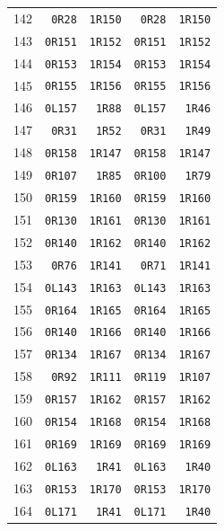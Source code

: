 \begin{longtable}{rrrrr}
142 & \texttt{0R28} & \texttt{1R150} & \texttt{0R28} & \texttt{1R150}\\
143 & \texttt{0R151} & \texttt{1R152} & \texttt{0R151} & \texttt{1R152}\\
144 & \texttt{0R153} & \texttt{1R154} & \texttt{0R153} & \texttt{1R154}\\
145 & \texttt{0R155} & \texttt{1R156} & \texttt{0R155} & \texttt{1R156}\\
146 & \texttt{0L157} & \texttt{1R88} & \texttt{0L157} & \texttt{1R46}\\
147 & \texttt{0R31} & \texttt{1R52} & \texttt{0R31} & \texttt{1R49}\\
148 & \texttt{0R158} & \texttt{1R147} & \texttt{0R158} & \texttt{1R147}\\
149 & \texttt{0R107} & \texttt{1R85} & \texttt{0R100} & \texttt{1R79}\\
150 & \texttt{0R159} & \texttt{1R160} & \texttt{0R159} & \texttt{1R160}\\
151 & \texttt{0R130} & \texttt{1R161} & \texttt{0R130} & \texttt{1R161}\\
152 & \texttt{0R140} & \texttt{1R162} & \texttt{0R140} & \texttt{1R162}\\
153 & \texttt{0R76} & \texttt{1R141} & \texttt{0R71} & \texttt{1R141}\\
154 & \texttt{0L143} & \texttt{1R163} & \texttt{0L143} & \texttt{1R163}\\
155 & \texttt{0R164} & \texttt{1R165} & \texttt{0R164} & \texttt{1R165}\\
156 & \texttt{0R140} & \texttt{1R166} & \texttt{0R140} & \texttt{1R166}\\
157 & \texttt{0R134} & \texttt{1R167} & \texttt{0R134} & \texttt{1R167}\\
158 & \texttt{0R92} & \texttt{1R111} & \texttt{0R119} & \texttt{1R107}\\
159 & \texttt{0R157} & \texttt{1R162} & \texttt{0R157} & \texttt{1R162}\\
160 & \texttt{0R154} & \texttt{1R168} & \texttt{0R154} & \texttt{1R168}\\
161 & \texttt{0R169} & \texttt{1R169} & \texttt{0R169} & \texttt{1R169}\\
162 & \texttt{0L163} & \texttt{1R41} & \texttt{0L163} & \texttt{1R40}\\
163 & \texttt{0R153} & \texttt{1R170} & \texttt{0R153} & \texttt{1R170}\\
164 & \texttt{0L171} & \texttt{1R41} & \texttt{0L171} & \texttt{1R40}\\

\end{longtable}
